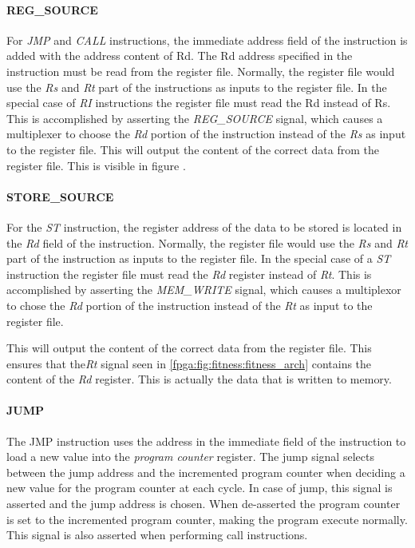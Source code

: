 \paragraph{REG\_SOURCE}
For \emph{JMP} and \emph{CALL} instructions, the immediate address field of the instruction is added with the address content of Rd.
The Rd address specified in the instruction must be read from the register file.
Normally, the register file would use the \emph{Rs} and \emph{Rt} part of the instructions as inputs to the register file.
In the special case of \emph{RI} instructions the register file must read the Rd instead of Rs.
This is accomplished by asserting the \emph{REG\_SOURCE} signal, which causes a multiplexer to choose the \emph{Rd} portion of the instruction instead of the \emph{Rs} as input to the register file.
This will output the content of the correct data from the register file.
This is visible in figure .


\paragraph{STORE\_SOURCE}
For the \emph{ST} instruction, the register address of the data to be stored is located in the \emph{Rd} field of the instruction.  Normally, the register file would use the \emph{Rs} and \emph{Rt} part of the instruction as inputs to the register file. In the special case of a \emph{ST} instruction the register file must read the \emph{Rd} register instead of \emph{Rt}. This is accomplished by asserting the \emph{MEM\_WRITE} signal, which causes a multiplexor to chose the \emph{Rd} portion of the instruction instead of the \emph{Rt} as input to the register file. 

This will output the content of the correct data from the register file. This ensures that the\emph{Rt} signal seen in \ref{fpga:fig:fitness:fitness_arch} contains the content of the \emph{Rd} register. This is actually the data that is written to memory.





\paragraph{JUMP}
The JMP instruction uses the address in the immediate field of the instruction to load a new value into the \emph{program counter} register.
The jump signal selects between the jump address and the incremented program counter when deciding a new value for the program counter at each cycle.
In case of jump, this signal is asserted and the jump address is chosen.
When de-asserted the program counter is set to the incremented program counter, making the program execute normally.
This signal is also asserted when performing call instructions.   

